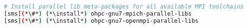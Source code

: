 
\begin{lstlisting}[language=bash,keywords={},upquote=true,keepspaces]
# Install parallel lib meta-packages for all available MPI toolchains
[sms](*\#*) (*\install*) ohpc-gnu7-mpich-parallel-libs
[sms](*\#*) (*\install*) ohpc-gnu7-openmpi-parallel-libs
\end{lstlisting}
